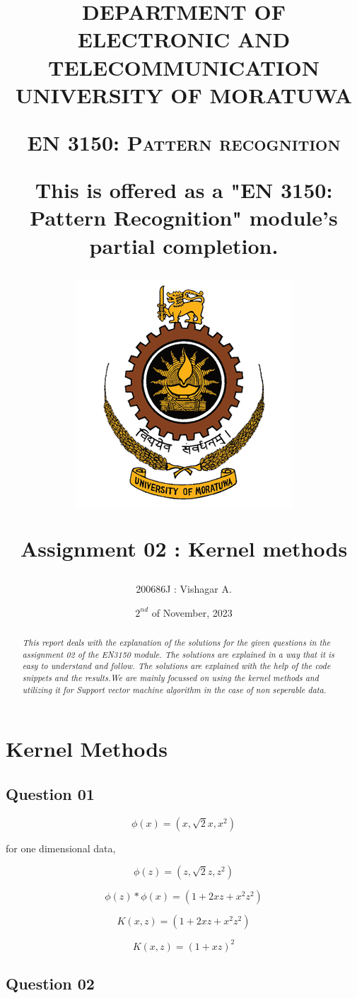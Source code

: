 \documentclass[11pt,a4paper]{article}
\title{DEPARTMENT OF ELECTRONIC AND TELECOMMUNICATION
UNIVERSITY OF MORATUWA

\vspace{10pt}

{\large{\textsc{EN 3150: Pattern recognition}}}

{\textsf{This is offered as a "EN 3150: Pattern Recognition" module's partial completion.}}

\vspace{30pt}
\includegraphics[scale=1.20]{images/University_of_Moratuwa_logo.png}

{\textsf{\textbf{Assignment 02 : Kernel methods}}}}
\author{200686J : Vishagar A.}
\date{$2^{nd}$ of November, 2023}
\begin{document}
\maketitle

\newpage

\begin{abstract}
    \textit{This report deals with the explanation of the solutions for the given questions in the assignment 02 of the EN3150 module. The solutions are explained in a way that it is easy to understand and follow. The solutions are explained with the help of the code snippets and the results.We are mainly focussed on using the kernel methods and utilizing it for Support vector machine algorithm in the case of non seperable data.}    
\end{abstract}    

\vspace{50pt}
\tableofcontents


\newpage

\twocolumn

\section{Kernel Methods}
\subsection{Question 01}

\begin{equation}
    \phi{(x)} =  (x,\sqrt{2}x,x^2)
\end{equation}

for one dimensional data,

\begin{equation}
    \phi{(z)} =  (z,\sqrt{2}z,z^2)
\end{equation}

\begin{equation}
    \phi{(z)}*\phi{(x)} =  (1 + 2xz + x^2z^2)
\end{equation}

\begin{equation}
    K(x,z) =  (1 + 2xz + x^2z^2)
\end{equation}

\begin{equation}
    K(x,z) =  (1 + xz)^2   
\end{equation}

\subsection{Question 02}
\end{document}
